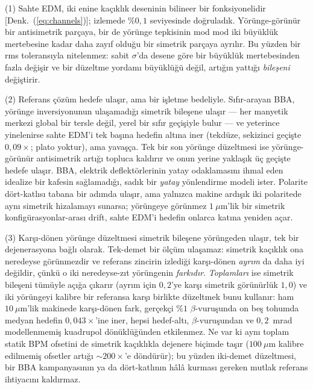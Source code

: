 \documentclass[aps,prab,reprint,superscriptaddress,nofootinbib]{revtex4-2}
\begin{document}
(1) Sahte EDM, iki enine kaçıklık deseninin bilineer bir fonksiyonelidir
[Denk.~(\ref{eq:channels})]; izlemede $\%0{,}1$ seviyesinde doğruladık. Yörünge-görünür
bir antisimetrik parçaya, bir de yörünge tepkisinin mod mod iki büyüklük mertebesine
kadar daha zayıf olduğu bir simetrik parçaya ayrılır. Bu yüzden bir rms toleransıyla
nitelenmez: sabit $\sigma$'da desene göre bir büyüklük mertebesinden fazla değişir ve
bir düzeltme yordamı büyüklüğü değil, artığın yattığı \emph{bileşeni} değiştirir.

(2) Referans çözüm hedefe ulaşır, ama bir işletme bedeliyle. Sıfır-arayan BBA,
yörünge inversiyonunun ulaşamadığı simetrik bileşene ulaşır --- her manyetik merkezi
global bir tersle değil, yerel bir sıfır geçişiyle bulur --- ve yeterince yinelenirse
sahte EDM'i tek başına hedefin altına iner (tekdüze, sekizinci geçişte $0{,}09\times$;
plato yoktur), ama yavaşça. Tek bir son yörünge düzeltmesi ise yörünge-görünür
antisimetrik artığı topluca kaldırır ve onun yerine yaklaşık üç geçişte hedefe ulaşır.
BBA, elektrik deflektörlerinin yatay odaklamasını ihmal eden idealize bir kafesin
sağlamadığı, sadık bir \emph{yatay} yönlendirme modeli ister. Polarite dört-katlısı
tabana bir adımda ulaşır, ama yalnızca makine ardışık iki polaritede aynı simetrik
hizalamayı sunarsa; yörüngeye görünmez $1~\mu$m'lik bir simetrik konfigürasyonlar-arası
drift, sahte EDM'i hedefin onlarca katına yeniden açar.

(3) Karşı-dönen yörünge düzeltmesi simetrik bileşene yörüngeden ulaşır, tek bir
dejenerasyona bağlı olarak. Tek-demet bir ölçüm ulaşamaz: simetrik kaçıklık ona
neredeyse görünmezdir ve referans zincirin izlediği karşı-dönen \emph{ayrım} da daha
iyi değildir, çünkü o iki neredeyse-zıt yörüngenin \emph{farkıdır}. \emph{Toplamları}
ise simetrik bileşeni tümüyle açığa çıkarır (ayrım için $0{,}2$'ye karşı simetrik
görünürlük $1{,}0$) ve iki yörüngeyi kalibre bir referansa karşı birlikte düzeltmek
bunu kullanır: ham $10~\mu$m'lik makinede karşı-dönen fark, gerçekçi $\%1$
$\beta$-vuruşunda on beş tohumda medyan hedefin $0{,}043\times$'ine iner, hepsi
hedef-altı, $\beta$-vuruşundan ve $0{,}2$~mrad modellenmemiş kuadrupol dönüklüğünden
etkilenmez. Ne var ki aynı toplam statik BPM ofsetini de simetrik kaçıklıkla dejenere
biçimde taşır ($100~\mu$m kalibre edilmemiş ofsetler artığı $\sim\!200\times$'e
döndürür); bu yüzden iki-demet düzeltmesi, bir BBA kampanyasının ya da dört-katlının
hâlâ kurması gereken mutlak referans ihtiyacını kaldırmaz.
\end{document}
